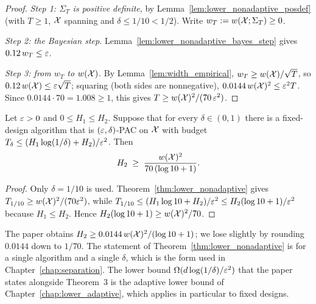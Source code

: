 \begin{proof}
\leanok
{}
\emph{Step 1: $\Sigma_T$ is positive definite}, by Lemma~\ref{lem:lower_nonadaptive_posdef}
(with $T \ge 1$, $\mathcal{X}$ spanning and $\delta \le 1/10 < 1/2$). Write
$w_T := w(\mathcal{X};\Sigma_T) \ge 0$.

\emph{Step 2: the Bayesian step.} Lemma~\ref{lem:lower_nonadaptive_bayes_step} gives
$0.12\, w_T \le \varepsilon$.

\emph{Step 3: from $w_T$ to $w(\mathcal{X})$.} By Lemma~\ref{lem:width_empirical},
$w_T \ge w(\mathcal{X})/\sqrt T$, so $0.12\,w(\mathcal{X}) \le \varepsilon\sqrt T$; squaring (both sides are
nonnegative), $0.0144\,w(\mathcal{X})^2 \le \varepsilon^2 T$. Since $0.0144 \cdot 70 = 1.008 \ge 1$, this
gives $T \ge w(\mathcal{X})^2/(70\,\varepsilon^2)$.
\end{proof}

\begin{corollary}\label{cor:lower_nonadaptive_H}
Let $\varepsilon > 0$ and $0 \le H_1 \le H_2$. Suppose that for every $\delta \in (0,1)$ there is a
fixed-design algorithm that is $(\varepsilon,\delta)$-PAC on $\mathcal{X}$ with budget
$T_\delta \le (H_1\log(1/\delta) + H_2)/\varepsilon^2$. Then
\[
  H_2 \;\ge\; \frac{w(\mathcal{X})^2}{70\,(\log 10 + 1)} .
\]
\end{corollary}

\begin{proof}
Only $\delta = 1/10$ is used. Theorem~\ref{thm:lower_nonadaptive} gives
$T_{1/10} \ge w(\mathcal{X})^2/(70\varepsilon^2)$, while
$T_{1/10} \le (H_1 \log 10 + H_2)/\varepsilon^2 \le H_2(\log 10 + 1)/\varepsilon^2$ because $H_1 \le H_2$.
Hence $H_2(\log 10 + 1) \ge w(\mathcal{X})^2/70$.
\end{proof}

\begin{remark}\label{rem:lower_nonadaptive_paper}
The paper obtains $H_2 \ge 0.0144\,w(\mathcal{X})^2/(\log 10 + 1)$; we lose slightly by rounding
$0.0144$ down to $1/70$. The statement of Theorem~\ref{thm:lower_nonadaptive} is for a single
algorithm and a single $\delta$, which is the form used in Chapter~\ref{chap:separation}.
The lower bound $\Omega(d\log(1/\delta)/\varepsilon^2)$ that the paper states alongside
Theorem~3 is the adaptive lower bound of Chapter~\ref{chap:lower_adaptive}, which applies in
particular to fixed designs.
\end{remark}
